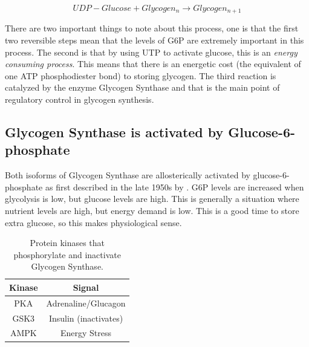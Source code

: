 \documentclass{tufte-handout}
\begin{document}
\begin{equation}
UDP-Glucose + Glycogen_n \rightarrow Glycogen_{n+1}
\end{equation}

There are two important things to note about this process, one is that the first two reversible steps mean that the levels of G6P are extremely important in this process.  The second is that by using UTP to activate glucose, this is an \emph{energy consuming process}.  This means that there is an energetic cost (the equivalent of one ATP phosphodiester bond) to storing glycogen.  The third reaction is catalyzed by the enzyme Glycogen Synthase and that is the main point of regulatory control in glycogen synthesis.

\subsection{Glycogen Synthase is activated by Glucose-6-phosphate}

Both isoforms of Glycogen Synthase are allosterically activated by glucose-6-phosphate as first described in the late 1950s by \citet{Leloir1959}.  G6P levels are increased when glycolysis is low, but glucose levels are high.  This is generally a situation where nutrient levels are high, but energy demand is low.  This is a good time to store extra glucose, so this makes physiological sense.

\begin{table}
\centering
\caption{Protein kinases that phosphorylate and inactivate Glycogen Synthase.}
\label{tab:gs-sites}
\begin{tabular}{cc}
\hline
\textbf {Kinase} & \textbf{Signal}  \\
\hline
PKA & Adrenaline/Glucagon \\
GSK3 & Insulin (inactivates) \\
AMPK & Energy Stress \\
\hline
\end{tabular}
\end{table}
\end{document}
